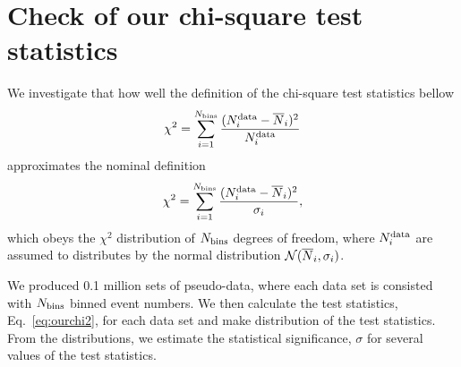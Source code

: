 \documentclass[12pt,a4paper]{article}
\begin{document}
\renewcommand{\thefootnote}{\fnsymbol{footnote}}



\setcounter{page}{1}
\renewcommand{\thefootnote}{\#\arabic{footnote}}
\setcounter{footnote}{0}

\section{Check of our chi-square test statistics}
We investigate that how well the definition of the chi-square test
statistics bellow
\begin{align}
 \chi^2 = \sum_{i=1}^{N_{\rm bins}} \frac{(N^{\rm data}_i
 -\overline{N}_i)^2}{N^{\rm data}_i} 
\label{eq:ourchi2}
\end{align}
approximates the nominal definition
\begin{align}
 \chi^2 = \sum_{i=1}^{N_{\rm bins}} \frac{(N^{\rm data}_i
 -\overline{N}_i)^2}{\sigma_i},
\label{eq:chi2}
\end{align}
which obeys the $\chi^2$ distribution of $N_{\rm bins}$ degrees of
freedom, where $N^{\rm data}_i$ are assumed to distributes by the normal
distribution ${\cal N}(\overline{N}_i,\sigma_i)$.

We produced 0.1 million sets of pseudo-data, where each data set is
consisted with $N_{\rm bins}$ binned event numbers. We then calculate
the test statistics, Eq.~\eqref{eq:ourchi2}, for each data set and make
distribution of the test statistics. From the distributions, we estimate
the statistical significance, $\sigma$ for several values of the test
statistics. 
\end{document}
